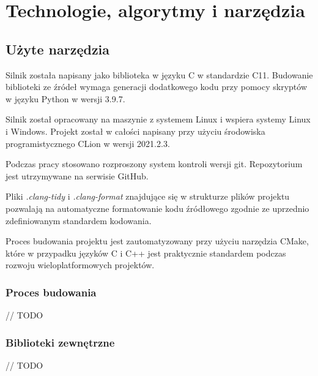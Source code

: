 \chapter{Technologie, algorytmy i narzędzia}
\label{chap:algs}

\section{Użyte narzędzia}

Silnik została napisany jako biblioteka w języku C w standardzie C11. Budowanie biblioteki ze źródeł wymaga generacji
dodatkowego kodu przy pomocy skryptów w języku Python w wersji 3.9.7.

Silnik został opracowany na maszynie z systemem Linux i wspiera systemy Linux i Windows. Projekt został w całości
napisany przy użyciu środowiska programistycznego CLion w wersji 2021.2.3.

Podczas pracy stosowano rozproszony system kontroli wersji git. Repozytorium jest utrzymywane na serwisie GitHub.

Pliki \textit{.clang-tidy} i \textit{.clang-format} znajdujące się w strukturze plików projektu pozwalają na automatyczne formatowanie
kodu źródłowego zgodnie ze uprzednio zdefiniowanym standardem kodowania.

Proces budowania projektu jest zautomatyzowany przy użyciu narzędzia CMake, które w przypadku języków C i C++ jest
praktycznie standardem podczas rozwoju wieloplatformowych projektów.

\subsection{Proces budowania}

// TODO


\subsection{Biblioteki zewnętrzne}

// TODO